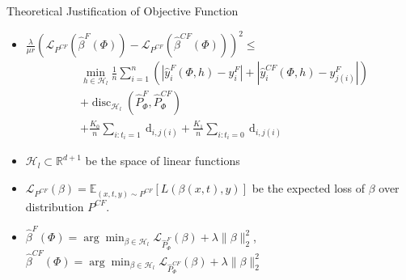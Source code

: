 \documentclass{beamer}
\begin{document}
	\begin{frame}{Theoretical Justification of Objective Function}
		\begin{itemize}
			\item $\frac{\lambda}{\mu r}\left(\mathcal{L}_{P^{CF}}\left(\hat{\beta}^{F}(\Phi)\right)-\mathcal{L}_{P^{CF}}\left(\hat{\beta}^{C F}(\Phi)\right)\right)^{2} \leq$
			\begin{align}
			&\min _{h \in \mathcal{H}_{l}} \frac{1}{n} \sum_{i=1}^{n}\left(\left|\hat{y}_{i}^{F}(\Phi, h)-y_{i}^{F}\right|+\left|\hat{y}_{i}^{C F}(\Phi, h)-y_{j(i)}^{F}\right|\right) \\
			&+ \operatorname{disc}_{\mathcal{H}_{l}}\left(\hat{P}_{\Phi}^{F}, \hat{P}_{\Phi}^{C F}\right)  \\
			&+ \frac{K_{0}}{n} \sum_{i: t_{i}=1} \mathrm{~d}_{i, j(i)}+\frac{K_{1}}{n} \sum_{i: t_{i}=0} \mathrm{~d}_{i, j(i)}
			\end{align}
		    \item $\mathcal{H}_{l} \subset \mathbb{R}^{d+1}$ be the space of linear functions
		    \item $\mathcal{L}_{P^{CF}}(\beta)=\mathbb{E}_{(x, t, y) \sim P^{CF}}[L(\beta(x, t), y)]$ be the expected loss of $\beta$ over distribution $P^{CF}$. 
		    \item $\hat{\beta}^{F}(\Phi)=\arg \min _{\beta \in \mathcal{H}_{l}} \mathcal{L}_{\hat{P}_{\Phi}^{F}}(\beta)+\lambda\|\beta\|_{2}^{2}$, $\hat{\beta}^{CF}(\Phi)=\arg \min _{\beta \in \mathcal{H}_{l}} \mathcal{L}_{\hat{P}_{\Phi}^{CF}}(\beta)+\lambda\|\beta\|_{2}^{2}$
		\end{itemize}
	\end{frame}
\end{document}
